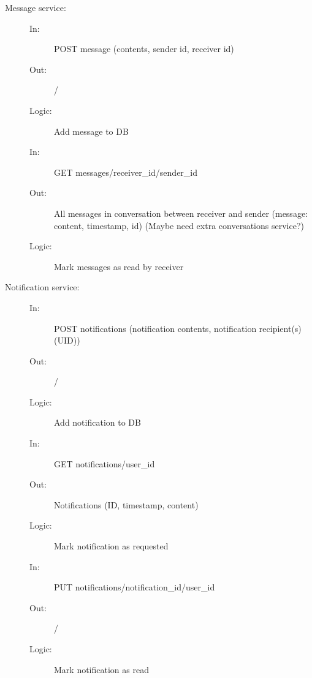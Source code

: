 \documentclass{article}
\begin{document}
\begin{description}
    \item [Message service:] 
    \begin{description}
        \item[]
        \item[In:] POST message (contents, sender id, receiver id)
        \item[Out:] /
        \item[Logic:] Add message to DB
        \item[]
        
        \item[In:] GET messages/receiver\_id/sender\_id
        \item[Out:] All messages in conversation between receiver and sender (message: content, timestamp, id) (Maybe need extra conversations service?)
        \item[Logic:] Mark messages as read by receiver
        \item[]
    \end{description}
\end{description}

\begin{description}
    \item [Notification service:] 
    \begin{description}
        \item[]
        \item[In:] POST notifications (notification contents, notification recipient(s) (UID))
        \item[Out:] /
        \item[Logic:] Add notification to DB
        \item[]
        
        \item[In:] GET notifications/user\_id 
        \item[Out:] Notifications (ID, timestamp, content)
        \item[Logic:] Mark notification as requested
        \item[]
        
        \item[In:] PUT notifications/notification\_id/user\_id
        \item[Out:] /
        \item[Logic: ] Mark notification as read
    \end{description}
\end{description}
\end{document}
